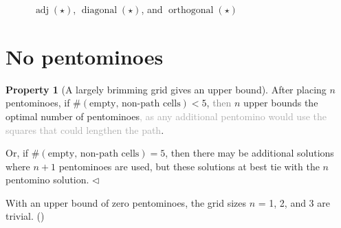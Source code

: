 \documentclass{article}
\theoremstyle{definition}%
\newtheorem{property}[theorem]{Property}
\newcommand{\markend}{\hfill{\large$\triangleleft$}}
\newcommand{\techdetail}[1]{\textcolor{darkgray}{#1}}
\newcommand{\minordetail}[1]{\textcolor{gray}{#1}}
\newcommand{\adj}{\operatorname{adj}}
\begin{document}
\begin{figure}[htbp]
    \centering
    \caption{$\adj(\star)$, $\operatorname{diagonal}(\star)$, and $\operatorname{orthogonal}(\star)$}
    \label{fig:adj}
\end{figure}





\clearpage
\section{No pentominoes}

\begin{property}[A largely brimming grid gives an upper bound]
\label{prop:brimmax}
After placing $n$ pentominoes, if $\#(\text{empty, non-path cells}) < 5$, \minordetail{then }$n$ upper bounds the optimal number of pentominoes\techdetail{, as any additional pentomino would use the squares that could lengthen the path}.

Or, if $\#(\text{empty, non-path cells}) = 5$, then there may be additional solutions
where $n + 1$ pentominoes are used, but these solutions at best tie with the
$n$ pentomino solution. \markend
\end{property}

With an upper bound of zero pentominoes, the grid sizes $n$ = 1, 2, and 3 are trivial. ()
\end{document}
